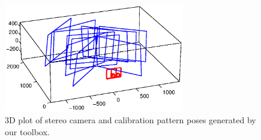 \documentclass{report}
\begin{document}
\begin{figure}
\centering
\includegraphics[trim=0in 0.1in 0in 0in, clip=true, width = 0.7\textwidth]{images/stereo3dbold}
\caption{3D plot of stereo camera and calibration pattern poses generated by our toolbox.}
\label{stereoPlot}
\end{figure}
\end{document}
